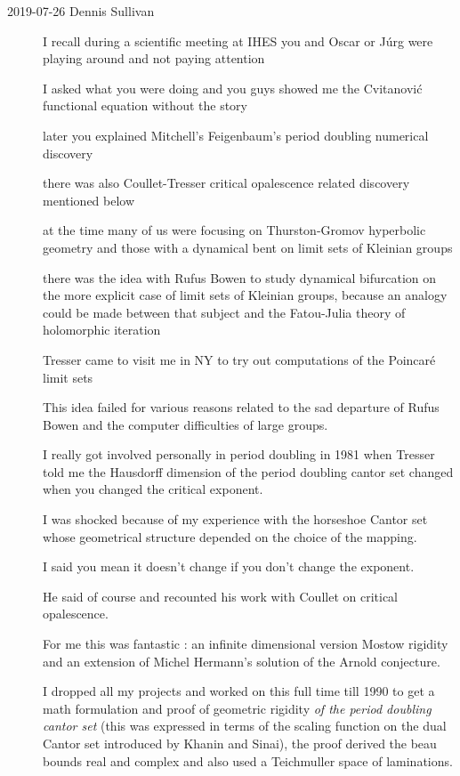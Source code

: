 \begin{description}
\item[2019-07-26 Dennis Sullivan] %
I recall during a scientific meeting at IHES you and Oscar or J{\'u}rg
were playing around and not paying attention

I asked what you were doing and you guys showed me the Cvitanovi{\'c} functional
equation without the story

later you explained Mitchell's Feigenbaum's period doubling
numerical discovery

there was also Coullet-Tresser critical opalescence related discovery
mentioned below

at the time  many of us were focusing on Thurston-Gromov hyperbolic
geometry and  those with a dynamical bent on limit sets of Kleinian
groups

there was the idea with Rufus Bowen to study dynamical bifurcation on the
more explicit case of limit sets of Kleinian groups,
because an analogy could be made between that subject and the Fatou-Julia
theory of holomorphic iteration

Tresser came to visit me in NY to try out computations of the Poincar\'e
limit sets

This idea failed for various reasons related to the sad departure of
Rufus Bowen and the computer difficulties of large groups.

I really got involved personally in period doubling in 1981 when Tresser
told me the Hausdorff dimension  of the period doubling cantor set changed
when you changed the critical exponent.

I was shocked because of my experience with the horseshoe Cantor set
whose geometrical structure depended on the choice of the mapping.

I said you mean it doesn't change if you don't change the exponent.

He said of course and recounted his work with Coullet on critical
opalescence.

For me this was fantastic :
an infinite dimensional version Mostow rigidity and an extension of
Michel Hermann's solution of the Arnold conjecture.

I dropped all my projects and worked on this full time till 1990 to get a
math formulation and proof of geometric  rigidity \emph{of the period
doubling cantor set} (this was expressed in terms of the scaling function
on the dual Cantor set introduced by Khanin and Sinai), the
proof derived the beau bounds real and complex and also used a
Teichmuller space of laminations.


\end{description}
